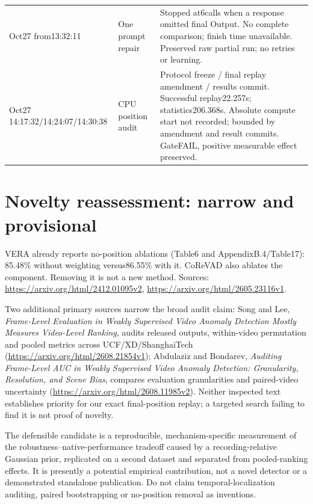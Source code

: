 \documentclass[10pt]{article}
\begin{document}
\begin{longtable}{p{2.65cm}p{3.1cm}p{9.0cm}}
Oct27 from13:32:11 & One prompt repair &Stopped at6calls when a response omitted final Output. No complete comparison; finish time unavailable. Preserved raw partial run; no retries or learning.\\
Oct27 14:17:32/14:24:07/14:30:38 & CPU position audit &Protocol freeze / final replay amendment / results commit. Successful replay22.257s; statistics206.368s. Absolute compute start not recorded; bounded by amendment and result commits. GateFAIL, positive measurable effect preserved.\\\bottomrule
\end{longtable}\normalsize

\section{Novelty reassessment: narrow and provisional}
VERA already reports no-position ablations (Table6 and AppendixB.4/Table17): 85.48\% without weighting versus86.55\% with it. CoReVAD also ablates the component. Removing it is not a new method. Sources: \url{https://arxiv.org/html/2412.01095v2}, \url{https://arxiv.org/html/2605.23116v1}.

Two additional primary sources narrow the broad audit claim: Song and Lee, \emph{Frame-Level Evaluation in Weakly Supervised Video Anomaly Detection Mostly Measures Video-Level Ranking}, audits released outputs, within-video permutation and pooled metrics across UCF/XD/ShanghaiTech (\url{https://arxiv.org/html/2608.21854v1}); Abdulaziz and Bondarev, \emph{Auditing Frame-Level AUC in Weakly Supervised Video Anomaly Detection: Granularity, Resolution, and Scene Bias}, compares evaluation granularities and paired-video uncertainty (\url{https://arxiv.org/html/2608.11985v2}). Neither inspected text establishes priority for our exact final-position replay; a targeted search failing to find it is not proof of novelty.

The defensible candidate is a reproducible, mechanism-specific measurement of the robustness--native-performance tradeoff caused by a recording-relative Gaussian prior, replicated on a second dataset and separated from pooled-ranking effects. It is presently a potential empirical contribution, not a novel detector or a demonstrated standalone publication. Do not claim temporal-localization auditing, paired bootstrapping or no-position removal as inventions.
\end{document}
